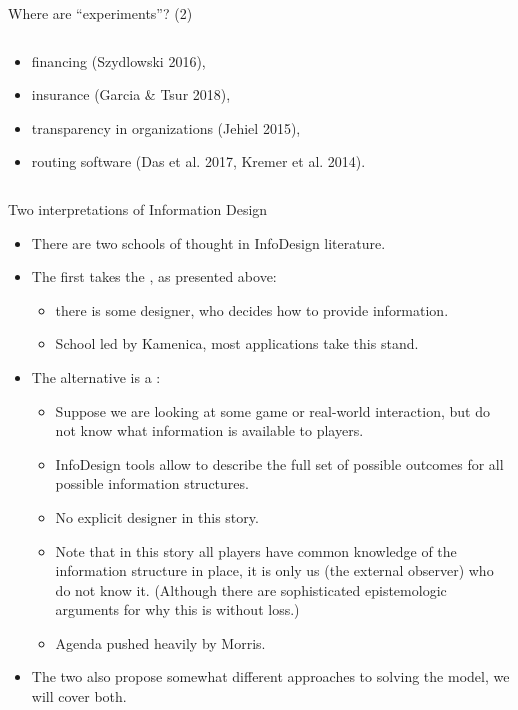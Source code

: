 \documentclass[english,10pt
,aspectratio=169
]{beamer}
\begin{document}
\begin{frame}{Where  are ``experiments''? (2)}
\begin{columns}
\begin{column}{0.5\linewidth}
\begin{itemize}
				\item financing (Szydlowski 2016), 
				
				\item insurance (Garcia \& Tsur 2018), 
				
				\item transparency in organizations (Jehiel 2015), 
				
				\item routing software (Das et al. 2017, Kremer et al. 2014).
			\end{itemize}
		\end{column}
	\end{columns}
	
\end{frame}


\begin{frame}{Two interpretations of Information Design}
\begin{itemize}
	\item There are two schools of thought in InfoDesign literature.
	\item The first takes the , as presented above:
	\begin{itemize}
		\item there is some designer, who decides how to provide information.
		\item School led by Kamenica, most applications take this stand. %
	\end{itemize}
	\item The alternative is a :
	\begin{itemize}
		\item Suppose we are looking at some game or real-world interaction, but do not know what information is available to players.
		\item InfoDesign tools allow to describe the full set of possible outcomes for all possible information structures. 
		\item No explicit designer in this story.
		\item Note that in this story all players have common knowledge of the information structure in place, it is only us (the external observer) who do not know it. (Although there are sophisticated epistemologic arguments for why this is without loss.)
		\item Agenda pushed heavily by Morris.
	\end{itemize}
	\item The two also propose somewhat different approaches to solving the model, we will cover both.
\end{itemize}
\end{frame}
\end{document}
